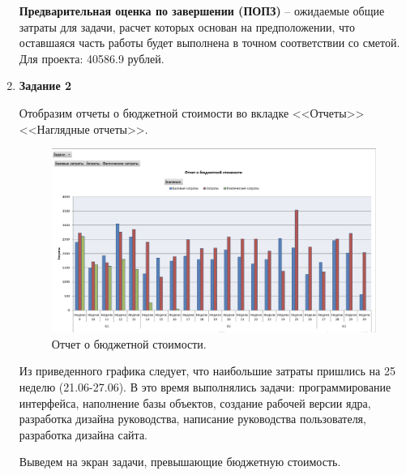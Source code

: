 \documentclass[a4paper,14pt]{extreport} %
\begin{document}
\begin{enumerate}
\textbf{Предварительная оценка по завершении (ПОПЗ)} -- ожидаемые общие затраты для задачи, расчет которых основан на предположении, что оставшаяся часть работы будет выполнена в точном соответствии со сметой. Для проекта: 40586.9 рублей.

\item \textbf{Задание 2}

Отобразим отчеты о бюджетной стоимости во вкладке <<Отчеты>> <<Наглядные отчеты>>.

\begin{figure}[H]
  \centering
  \caption{Отчет о бюджетной стоимости. }
  \includegraphics[scale=0.55]{2}
\end{figure}

Из приведенного графика следует, что наибольшие затраты пришлись на 25 неделю (21.06-27.06). 
В это время выполнялись задачи: программирование интерфейса, наполнение базы объектов, создание рабочей версии ядра, разработка дизайна руководства, написание руководства пользователя, разработка дизайна сайта.

Выведем на экран задачи, превышающие бюджетную стоимость.


\end{enumerate}
\end{document}
